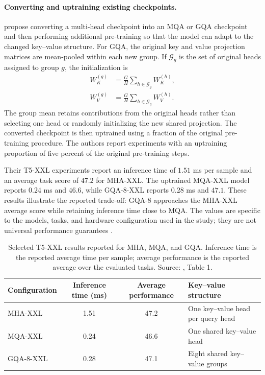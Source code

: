 \paragraph{Converting and uptraining existing checkpoints.}
\textcite{ainslie2023gqa} propose converting a multi-head checkpoint into
an MQA or GQA checkpoint and then performing additional pre-training so
that the model can adapt to the changed key--value structure. For GQA,
the original key and value projection matrices are mean-pooled within
each new group. If \(\mathcal{G}_g\) is the set of original heads assigned
to group \(g\), the initialization is
\begin{align}
    W_K^{(g)}
    &=
    \frac{G}{H}
    \sum_{h\in\mathcal{G}_g}W_K^{(h)},
    \label{eq:attn-gqa-key-mean}\\
    W_V^{(g)}
    &=
    \frac{G}{H}
    \sum_{h\in\mathcal{G}_g}W_V^{(h)}.
    \label{eq:attn-gqa-value-mean}
\end{align}
The group mean retains contributions from the original heads rather than
selecting one head or randomly initializing the new shared projection.
The converted checkpoint is then uptrained using a fraction of the
original pre-training procedure. The authors report experiments with an
uptraining proportion of five percent of the original pre-training steps.

Their T5-XXL experiments report an inference time of \(1.51\) ms per
sample and an average task score of \(47.2\) for MHA-XXL. The uptrained
MQA-XXL model reports \(0.24\) ms and \(46.6\), while GQA-8-XXL reports
\(0.28\) ms and \(47.1\). These results illustrate the reported trade-off:
GQA-8 approaches the MHA-XXL average score while retaining inference
time close to MQA. The values are specific to the models, tasks, and
hardware configuration used in the study; they are not universal
performance guarantees \parencite{ainslie2023gqa}.

\begin{table}[htbp]
    \centering
    \caption{Selected T5-XXL results reported for MHA, MQA, and GQA.
    Inference time is the reported average time per sample; average
    performance is the reported average over the evaluated tasks.
    Source: \textcite{ainslie2023gqa}, Table 1.}
    \label{tab:attn-gqa-results}
    \small
    \begin{tabularx}{\textwidth}{l c c X}
        \toprule
        Configuration
        & Inference time (ms)
        & Average performance
        & Key--value structure \\
        \midrule
        MHA-XXL
        & 1.51
        & 47.2
        & One key--value head per query head \\
        MQA-XXL
        & 0.24
        & 46.6
        & One shared key--value head \\
        GQA-8-XXL
        & 0.28
        & 47.1
        & Eight shared key--value groups \\
        \bottomrule
    \end{tabularx}
    \normalsize
\end{table}

